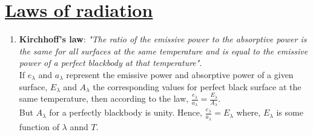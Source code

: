 \documentclass[12pt,a4paper]{article}
\begin{document}
\section{\underline{Laws of radiation}}
\begin{enumerate}
	\item \textbf{Kirchhoff's law}: \textit{"The ratio of the emissive power to the absorptive power is the same for all surfaces at the same temperature and is equal to the emissive power of a perfect blackbody at that temperature"}.
	\\
	If $e_{\lambda}$ and $a_{\lambda}$ represent the emissive power and absorptive power of a given surface, $E_{\lambda}$ and $A_{\lambda}$ the corresponding values for perfect black surface at the same temperature,
	then according to the law,
	$\frac{e_{\lambda}}{a_{\lambda}} = \frac{E_{\lambda}}{A_{\lambda}}$.
	\\
	But $A_{\lambda}$ for a perfectly blackbody is unity. Hence, $\frac{e_{\lambda}}{a_{\lambda}} = E_{\lambda} $ where, $E_{\lambda}$ is some function of $\lambda$ annd $T$.
\end{enumerate}
\end{document}
